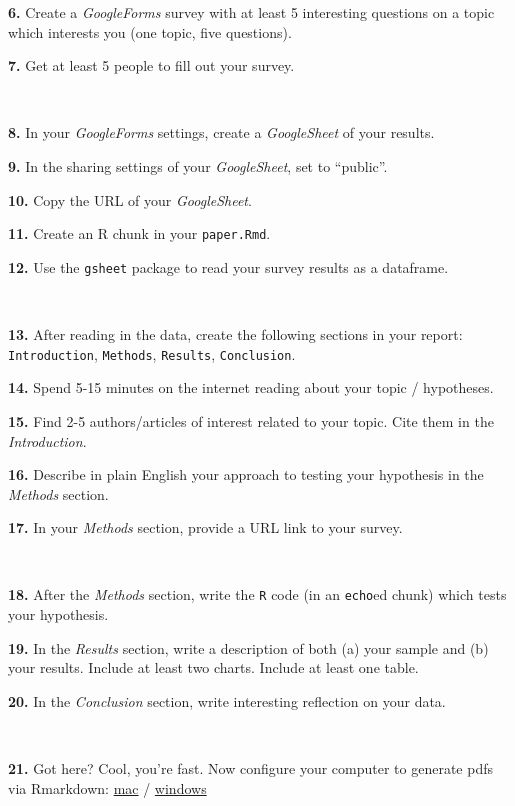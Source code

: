 \documentclass[
]{book}
\begin{document}
\textbf{6.} Create a \emph{GoogleForms} survey with at least 5 interesting questions on a topic which interests you (one topic, five questions).

\textbf{7.} Get at least 5 people to fill out your survey.

~

\textbf{8.} In your \emph{GoogleForms} settings, create a \emph{GoogleSheet} of your results.

\textbf{9.} In the sharing settings of your \emph{GoogleSheet}, set to ``public''.

\textbf{10.} Copy the URL of your \emph{GoogleSheet}.

\textbf{11.} Create an R chunk in your \texttt{paper.Rmd}.

\textbf{12.} Use the \texttt{gsheet} package to read your survey results as a dataframe.

~

\textbf{13.} After reading in the data, create the following sections in your report: \texttt{Introduction}, \texttt{Methods}, \texttt{Results}, \texttt{Conclusion}.

\textbf{14.} Spend 5-15 minutes on the internet reading about your topic / hypotheses.

\textbf{15.} Find 2-5 authors/articles of interest related to your topic. Cite them in the \emph{Introduction}.

\textbf{16.} Describe in plain English your approach to testing your hypothesis in the \emph{Methods} section.

\textbf{17.} In your \emph{Methods} section, provide a URL link to your survey.

~

\textbf{18.} After the \emph{Methods} section, write the \texttt{R} code (in an \texttt{echo}ed chunk) which tests your hypothesis.

\textbf{19.} In the \emph{Results} section, write a description of both (a) your sample and (b) your results. Include at least two charts. Include at least one table.

\textbf{20.} In the \emph{Conclusion} section, write interesting reflection on your data.

~

\textbf{21.} Got here? Cool, you're fast. Now configure your computer to generate pdfs via Rmarkdown: \href{https://medium.com/@sorenlind/create-pdf-reports-using-r-r-markdown-latex-and-knitr-on-macos-high-sierra-e7b5705c9fd}{mac} / \href{https://medium.com/@sorenlind/create-pdf-reports-using-r-r-markdown-latex-and-knitr-on-windows-10-952b0c48bfa9}{windows}
\end{document}
